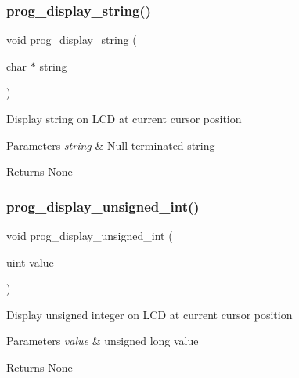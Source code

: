\subsubsection{\texorpdfstring{prog\+\_\+display\+\_\+string()}{prog\_display\_string()}}
{\footnotesize\ttfamily void prog\+\_\+display\+\_\+string (\begin{DoxyParamCaption}\item[{char $\ast$}]{string }\end{DoxyParamCaption})}

Display string on L\+CD at current cursor position 
\begin{DoxyParams}{Parameters}
{\em string} & Null-\/terminated string \\
\hline
\end{DoxyParams}
\begin{DoxyReturn}{Returns}
None 
\end{DoxyReturn}
\mbox{\label{group__scaffolding_ga455086b694579da94041147474387a9b}} 
\subsubsection{\texorpdfstring{prog\+\_\+display\+\_\+unsigned\+\_\+int()}{prog\_display\_unsigned\_int()}}
{\footnotesize\ttfamily void prog\+\_\+display\+\_\+unsigned\+\_\+int (\begin{DoxyParamCaption}\item[{uint}]{value }\end{DoxyParamCaption})}

Display unsigned integer on L\+CD at current cursor position 
\begin{DoxyParams}{Parameters}
{\em value} & unsigned long value \\
\hline
\end{DoxyParams}
\begin{DoxyReturn}{Returns}
None 
\end{DoxyReturn}
\mbox{\label{group__scaffolding_gae2602aec28da58d379b4136b455a62d7}} 
